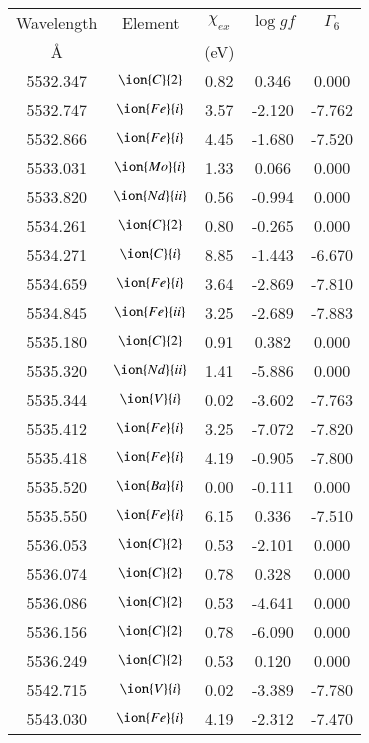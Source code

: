 \documentclass[fleqn,usenatbib]{mnras}
\begin{document}
\begin{center}
 \begin{table}
 \begin{tabular}{ccccc}
 \hline
 Wavelength & Element & $\chi_{ex}$ &  $\log gf$ & $\varGamma_{6}$ \\
   \AA{}    &         &  (eV)       &            &                  \\
 \hline
5532.347 &  $\ion{C}{2}$ & 0.82 & 0.346 & 0.000 \\ 
5532.747 &  $\ion{Fe}{i}$  & 3.57 & -2.120 & -7.762 \\ 
5532.866 &  $\ion{Fe}{i}$  & 4.45 & -1.680 & -7.520 \\ 
5533.031 &  $\ion{Mo}{i}$  & 1.33 & 0.066 & 0.000 \\ 
5533.820 &  $\ion{Nd}{ii}$  & 0.56 & -0.994 & 0.000 \\ 
5534.261 &  $\ion{C}{2}$ & 0.80 & -0.265 & 0.000 \\ 
5534.271 &  $\ion{C}{i}$  & 8.85 & -1.443 & -6.670 \\ 
5534.659 &  $\ion{Fe}{i}$  & 3.64 & -2.869 & -7.810 \\ 
5534.845 &  $\ion{Fe}{ii}$  & 3.25 & -2.689 & -7.883 \\ 
5535.180 &  $\ion{C}{2}$ & 0.91 & 0.382 & 0.000 \\ 
5535.320 &  $\ion{Nd}{ii}$  & 1.41 & -5.886 & 0.000 \\ 
5535.344 &  $\ion{V}{i}$  & 0.02 & -3.602 & -7.763 \\ 
5535.412 &  $\ion{Fe}{i}$  & 3.25 & -7.072 & -7.820 \\ 
5535.418 &  $\ion{Fe}{i}$  & 4.19 & -0.905 & -7.800 \\ 
5535.520 &  $\ion{Ba}{i}$  & 0.00 & -0.111 & 0.000 \\ 
5535.550 &  $\ion{Fe}{i}$  & 6.15 & 0.336 & -7.510 \\ 
5536.053 &  $\ion{C}{2}$ & 0.53 & -2.101 & 0.000 \\ 
5536.074 &  $\ion{C}{2}$ & 0.78 & 0.328 & 0.000 \\ 
5536.086 &  $\ion{C}{2}$ & 0.53 & -4.641 & 0.000 \\ 
5536.156 &  $\ion{C}{2}$ & 0.78 & -6.090 & 0.000 \\ 
5536.249 &  $\ion{C}{2}$ & 0.53 & 0.120 & 0.000 \\ 
5542.715 &  $\ion{V}{i}$  & 0.02 & -3.389 & -7.780 \\ 
5543.030 &  $\ion{Fe}{i}$  & 4.19 & -2.312 & -7.470 \\ 

\end{tabular}
\end{table}
\end{center}
\end{document}
